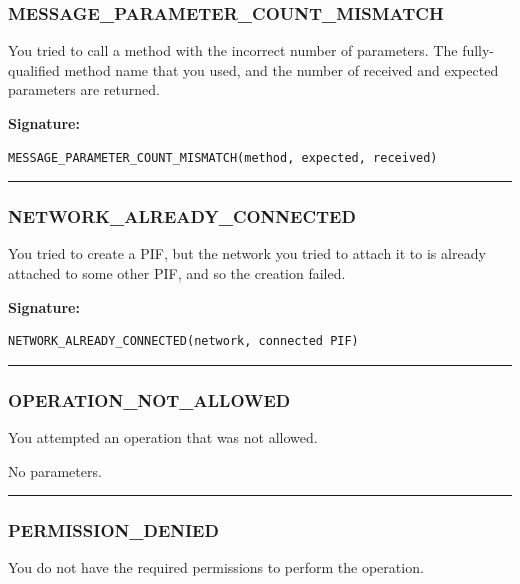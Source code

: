 \subsubsection{MESSAGE\_PARAMETER\_COUNT\_MISMATCH}

You tried to call a method with the incorrect number of parameters.  The
fully-qualified method name that you used, and the number of received and
expected parameters are returned.

\vspace{0.3cm}
{\bf Signature:}
\begin{verbatim}MESSAGE_PARAMETER_COUNT_MISMATCH(method, expected, received)\end{verbatim}
\begin{center}\rule{10em}{0.1pt}\end{center}

\subsubsection{NETWORK\_ALREADY\_CONNECTED}

You tried to create a PIF, but the network you tried to attach it to is
already attached to some other PIF, and so the creation failed.

\vspace{0.3cm}
{\bf Signature:}
\begin{verbatim}NETWORK_ALREADY_CONNECTED(network, connected PIF)\end{verbatim}
\begin{center}\rule{10em}{0.1pt}\end{center}

\subsubsection{OPERATION\_NOT\_ALLOWED}

You attempted an operation that was not allowed.

\vspace{0.3cm}
No parameters.
\begin{center}\rule{10em}{0.1pt}\end{center}

\subsubsection{PERMISSION\_DENIED}

You do not have the required permissions to perform the operation.

